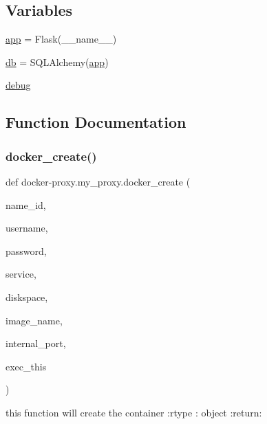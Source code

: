 \subsection*{Variables}
\begin{DoxyCompactItemize}
\item 
\hyperlink{namespacedocker-proxy_1_1my__proxy_a1316b64a06ccf8940bd886efa8d18660}{app} = Flask(\+\_\+\+\_\+name\+\_\+\+\_\+)
\item 
\hyperlink{namespacedocker-proxy_1_1my__proxy_a3cda0544280d27f01985434ab3efa4b3}{db} = S\+Q\+L\+Alchemy(\hyperlink{namespacedocker-proxy_1_1my__proxy_a1316b64a06ccf8940bd886efa8d18660}{app})
\item 
\hyperlink{namespacedocker-proxy_1_1my__proxy_a4cb4fb47e79c0c24a5b66136731a0b0c}{debug}
\end{DoxyCompactItemize}


\subsection{Function Documentation}
\hypertarget{namespacedocker-proxy_1_1my__proxy_a7c16c9ad1dd493bd800fb0ccb04cfe32}{}\label{namespacedocker-proxy_1_1my__proxy_a7c16c9ad1dd493bd800fb0ccb04cfe32} 
\subsubsection{\texorpdfstring{docker\+\_\+create()}{docker\_create()}}
{\footnotesize\ttfamily def docker-\/proxy.\+my\+\_\+proxy.\+docker\+\_\+create (\begin{DoxyParamCaption}\item[{}]{name\+\_\+id,  }\item[{}]{username,  }\item[{}]{password,  }\item[{}]{service,  }\item[{}]{diskspace,  }\item[{}]{image\+\_\+name,  }\item[{}]{internal\+\_\+port,  }\item[{}]{exec\+\_\+this }\end{DoxyParamCaption})}

\begin{DoxyVerb}this function will create the container
:rtype : object
:return:
\end{DoxyVerb}
 

